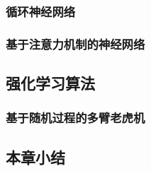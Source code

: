 \subsubsection{循环神经网络}

\subsubsection{基于注意力机制的神经网络}

\subsection{强化学习算法}

\subsubsection{基于随机过程的多臂老虎机}
\subsection{本章小结}


